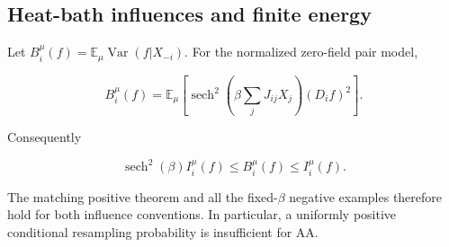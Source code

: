 \subsection{Heat-bath influences and finite
energy}\label{proof:local_interactions:heat-bath-influences-and-finite-energy}

Let \(B_i^\mu (f)=\mathbb{E}_\mu  \operatorname{Var}(f|X_{-i})\). For
the normalized zero-field pair model,

\[
B_i^\mu(f)=\mathbb{E}_\mu\left[\operatorname{sech}^2\!\left(\beta\sum_jJ_{ij}X_j\right)(D_if)^2\right].
\]

Consequently

\[
\operatorname{sech}^2(\beta)I_i^\mu(f)\le B_i^\mu(f)\le I_i^\mu(f).
\]

The matching positive theorem and all the fixed-\(\beta\) negative
examples therefore hold for both influence conventions. In particular, a
uniformly positive conditional resampling probability is insufficient
for AA.
